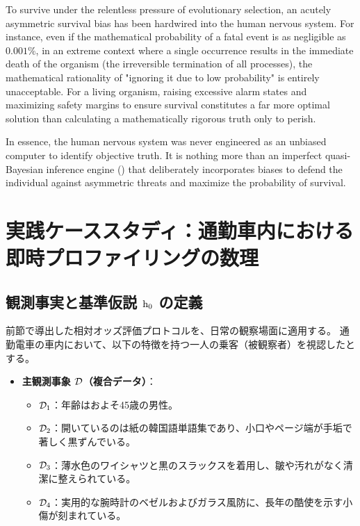     To survive under the relentless pressure of evolutionary selection, an acutely asymmetric survival bias has been hardwired into the human nervous system. For instance, even if the mathematical probability of a fatal event is as negligible as $0.001\%$, in an extreme context where a single occurrence results in the immediate death of the organism (the irreversible termination of all processes), the mathematical rationality of "ignoring it due to low probability" is entirely unacceptable. For a living organism, raising excessive alarm states and maximizing safety margins to ensure survival constitutes a far more optimal solution than calculating a mathematically rigorous truth only to perish.

    In essence, the human nervous system was never engineered as an unbiased computer to identify objective truth. It is nothing more than an imperfect quasi-Bayesian inference engine (\fullNQBIE) that deliberately incorporates biases to defend the individual against asymmetric threats and maximize the probability of survival.
\fi

\ifja
    \section{実践ケーススタディ：通勤車内における即時プロファイリングの数理}
    \label{sec:case_commuter_profiling}

    \subsection{観測事実と基準仮説 $\mathrm{h}_0$ の定義}

    前節で導出した相対オッズ評価プロトコルを、日常の観察場面に適用する。
    通勤電車の車内において、以下の特徴を持つ一人の乗客（被観察者）を視認したとする。
    \begin{itemize}
        \item \textbf{主観測事象 $\mathcal{D}$（複合データ）}：
            \begin{itemize}
                \item $\mathcal{D}_1$：年齢はおよそ45歳の男性。
                \item $\mathcal{D}_2$：開いているのは紙の韓国語単語集であり、小口やページ端が手垢で著しく黒ずんでいる。
                \item $\mathcal{D}_3$：薄水色のワイシャツと黒のスラックスを着用し、皺や汚れがなく清潔に整えられている。
                \item $\mathcal{D}_4$：実用的な腕時計のベゼルおよびガラス風防に、長年の酷使を示す小傷が刻まれている。
            \end{itemize}
    \end{itemize}

